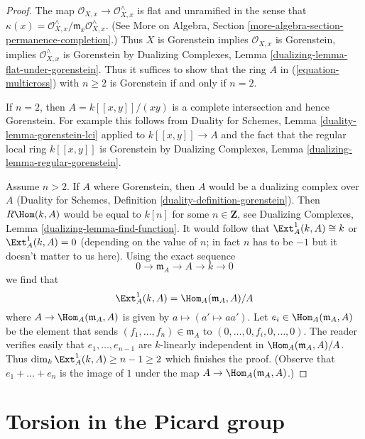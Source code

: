 \begin{proof}
The map $\mathcal{O}_{X, x} \to \mathcal{O}_{X, x}^\wedge$
is flat and unramified in the sense that
$\kappa(x) = \mathcal{O}_{X, x}^\wedge/\mathfrak m_x \mathcal{O}_{X, x}^\wedge$.
(See More on Algebra, Section \ref{more-algebra-section-permanence-completion}.)
Thus $X$ is Gorenstein implies $\mathcal{O}_{X, x}$ is Gorenstein, implies
$\mathcal{O}_{X, x}^\wedge$ is Gorenstein by
Dualizing Complexes, Lemma \ref{dualizing-lemma-flat-under-gorenstein}.
Thus it suffices to show that the ring $A$ in
(\ref{equation-multicross}) with $n \geq 2$
is Gorenstein if and only if $n = 2$.

\medskip\noindent
If $n = 2$, then $A = k[[x, y]]/(xy)$ is a complete intersection
and hence Gorenstein. For example this follows from
Duality for Schemes, Lemma \ref{duality-lemma-gorenstein-lci}
applied to $k[[x, y]] \to A$ and the fact that the regular
local ring $k[[x, y]]$ is Gorenstein by
Dualizing Complexes, Lemma \ref{dualizing-lemma-regular-gorenstein}.

\medskip\noindent
Assume $n > 2$. If $A$ where Gorenstein, then $A$ would be a
dualizing complex over $A$
(Duality for Schemes, Definition \ref{duality-definition-gorenstein}).
Then $R\Hom(k, A)$ would be equal to $k[n]$ for some $n \in \mathbf{Z}$, see
Dualizing Complexes, Lemma \ref{dualizing-lemma-find-function}.
It would follow that $\Ext^1_A(k, A) \cong k$
or $\Ext^1_A(k, A) = 0$ (depending on the value of $n$;
in fact $n$ has to be $-1$ but it doesn't matter to us here).
Using the exact sequence
$$
0 \to \mathfrak m_A \to A \to k \to 0
$$
we find that
$$
\Ext^1_A(k, A) = \Hom_A(\mathfrak m_A, A)/A
$$
where $A \to \Hom_A(\mathfrak m_A, A)$ is given by
$a \mapsto (a' \mapsto aa')$. Let $e_i \in \Hom_A(\mathfrak m_A, A)$
be the element that sends $(f_1, \ldots, f_n) \in \mathfrak m_A$ to
$(0, \ldots, 0, f_i, 0, \ldots, 0)$. The reader verifies easily
that $e_1, \ldots, e_{n - 1}$ are $k$-linearly independent in
$\Hom_A(\mathfrak m_A, A)/A$. Thus
$\dim_k \Ext^1_A(k, A) \geq n - 1 \geq 2$ which
finishes the proof.
(Observe that $e_1 + \ldots + e_n$ is the image of $1$ under the map
$A \to \Hom_A(\mathfrak m_A, A)$.)
\end{proof}




\section{Torsion in the Picard group}
\label{section-torsion-in-pic}

